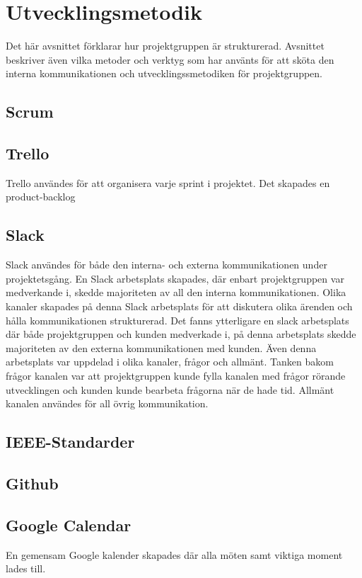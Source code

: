 \section{Utvecklingsmetodik}
Det här avsnittet förklarar hur projektgruppen är strukturerad. Avsnittet beskriver även vilka metoder och verktyg som har använts för att sköta den interna kommunikationen och utvecklingssmetodiken för projektgruppen.

\subsection*{Scrum}
\subsection*{Trello}
Trello användes för att organisera varje sprint i projektet. Det skapades en product-backlog 

\subsection*{Slack}
Slack användes för både den interna- och externa kommunikationen under projektetsgång. En Slack arbetsplats skapades, där enbart projektgruppen var medverkande i, skedde majoriteten av all den interna kommunikationen. Olika kanaler skapades på denna Slack arbetsplats för att diskutera olika ärenden och hålla kommunikationen strukturerad. Det fanns ytterligare en slack arbetsplats där både projektgruppen och kunden medverkade i, på denna arbetsplats skedde majoriteten av den externa kommunikationen med kunden. Även denna arbetsplats var uppdelad i olika kanaler, frågor och allmänt. Tanken bakom frågor kanalen var att projektgruppen kunde fylla kanalen med frågor rörande utvecklingen och kunden kunde bearbeta frågorna när de hade tid. Allmänt kanalen användes för all övrig kommunikation.


\subsection*{IEEE-Standarder}
\subsection*{Github}
\subsection*{Google Calendar}
En gemensam Google kalender skapades där alla möten samt viktiga moment lades till.

